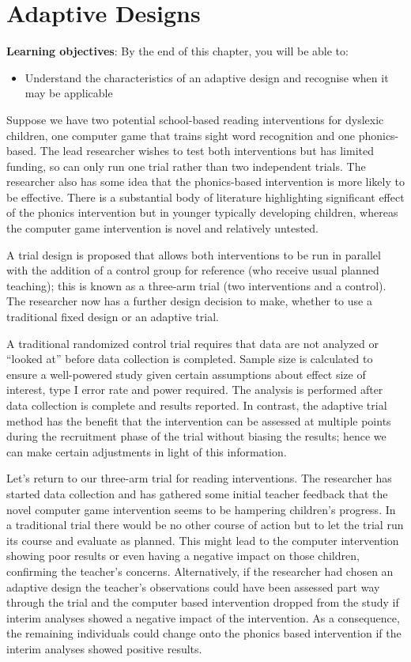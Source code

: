 \documentclass{krantz}
\providecommand{\tightlist}{%
\setlength{\itemsep}{0pt}\setlength{\parskip}{0pt}}
\begin{document}
\hypertarget{adaptive}{%
\chapter{Adaptive Designs}\label{adaptive}}

\textbf{Learning objectives}: By the end of this chapter, you will be able to:

\begin{itemize}
\tightlist
\item
  Understand the characteristics of an adaptive design and recognise when it may be applicable
\end{itemize}

Suppose we have two potential school-based reading interventions for dyslexic children, one computer game that trains sight word recognition and one phonics-based. The lead researcher wishes to test both interventions but has limited funding, so can only run one trial rather than two independent trials. The researcher also has some idea that the phonics-based intervention is more likely to be effective. There is a substantial body of literature highlighting significant effect of the phonics intervention but in younger typically developing children, whereas the computer game intervention is novel and relatively untested.

A trial design is proposed that allows both interventions to be run in parallel with the addition of a control group for reference (who receive usual planned teaching); this is known as a three-arm trial (two interventions and a control). The researcher now has a further design decision to make, whether to use a traditional fixed design or an adaptive trial.

A traditional randomized control trial requires that data are not analyzed or ``looked at'' before data collection is completed. Sample size is calculated to ensure a well-powered study given certain assumptions about effect size of interest, type I error rate and power required. The analysis is performed after data collection is complete and results reported. In contrast, the adaptive trial method has the benefit that the intervention can be assessed at multiple points during the recruitment phase of the trial without biasing the results; hence we can make certain adjustments in light of this information.

Let's return to our three-arm trial for reading interventions. The researcher has started data collection and has gathered some initial teacher feedback that the novel computer game intervention seems to be hampering children's progress. In a traditional trial there would be no other course of action but to let the trial run its course and evaluate as planned. This might lead to the computer intervention showing poor results or even having a negative impact on those children, confirming the teacher's concerns. Alternatively, if the researcher had chosen an adaptive design the teacher's observations could have been assessed part way through the trial and the computer based intervention dropped from the study if interim analyses showed a negative impact of the intervention. As a consequence, the remaining individuals could change onto the phonics based intervention if the interim analyses showed positive results.
\end{document}
